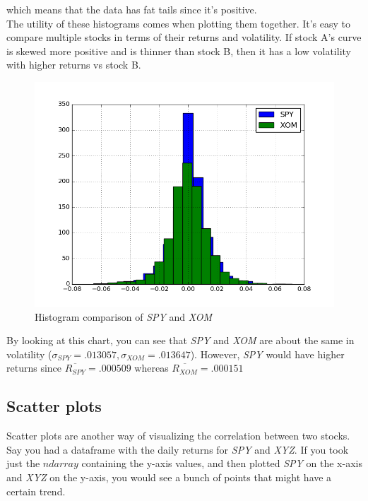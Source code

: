 \noindent which means that the data has fat tails since it's positive.\\

\noindent The utility of these histograms comes when plotting them together. It's easy to compare multiple stocks in terms of their returns and volatility. If stock A's curve is skewed more positive and is thinner than stock B, then it has a low volatility with higher returns vs stock B.\\

\begin{figure}[h!]
	\centering
	\includegraphics[width=\textwidth]{images/histograms_comparison.png}
    \caption{Histogram comparison of \textit{SPY} and \textit{XOM}}
\end{figure}
\newpage
\noindent By looking at this chart, you can see that \textit{SPY} and \textit{XOM} are about the same in volatility ($\sigma_{SPY} = .013057, \sigma_{XOM} = .013647$). However, \textit{SPY} would have higher returns since $\overline{R_{SPY}} = .000509$ whereas $\overline{R_{XOM}} = .000151$ 

\subsection{Scatter plots}
\noindent Scatter plots are another way of visualizing the correlation between two stocks. Say you had a dataframe with the daily returns for \textit{SPY} and \textit{XYZ}. If you took just the $ndarray$ containing the y-axis values, and then plotted \textit{SPY} on the x-axis and \textit{XYZ} on the y-axis, you would see a bunch of points that might have a certain trend.\\

